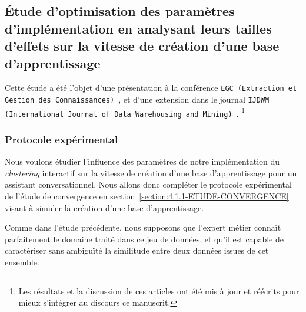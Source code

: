 \begin{tcolorbox}[
		title=\faVial~\textbf{Hypothèse d'efficience}~\faVial,
		colback=colorTcolorboxHypothesis!15,
		colframe=colorTcolorboxHypothesis!75,
		width=\linewidth
	]
	\end{tcolorbox}
	
	\subsection{Étude d'optimisation des paramètres d’implémentation en analysant leurs tailles d'effets sur la vitesse de création d'une base d'apprentissage}
	\label{section:4.2.1-ETUDE-OPTIMISATION}
			
		\begin{leftBarInformation}
			Cette étude a été l'objet d'une présentation à la conférence \texttt{EGC (Extraction et Gestion des Connaissances)}~\citep{schild:conception-interactive-clustering:2021}, et d'une extension dans le journal \texttt{IJDWM (International Journal of Data Warehousing and Mining)}~\citep{schild:extension-interactive-clustering:2022}.
			\footnote{Les résultats et la discussion de ces articles ont été mis à jour et réécrits pour mieux s'intégrer au discours ce manuscrit.}
		\end{leftBarInformation}

		\subsubsection{Protocole expérimental}

			Nous voulons étudier l'influence des paramètres de notre implémentation du \textit{clustering} interactif sur la vitesse de création d'une base d'apprentissage pour un assistant conversationnel.
			Nous allons donc compléter le protocole expérimental de l'étude de convergence en section~\ref{section:4.1.1-ETUDE-CONVERGENCE} visant à simuler la création d'une base d'apprentissage.
			
			\begin{leftBarWarning}
				Comme dans l'étude précédente, nous supposons que l'expert métier connaît parfaitement le domaine traité dans ce jeu de données, et qu'il est capable de caractériser sans ambiguïté la similitude entre deux données issues de cet ensemble.
			\end{leftBarWarning}
			
